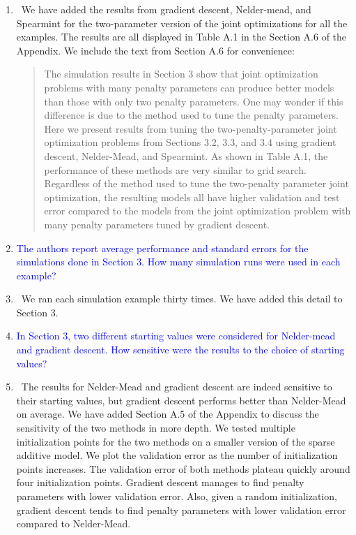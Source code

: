 \documentclass[]{article}
\newcommand{\point}[1]{\item \textcolor{blue}{#1}}
\newcommand{\reply}{\item[]\ }
\begin{document}
\begin{enumerate}
		\reply We have added the results from gradient descent, Nelder-mead, and Spearmint for the two-parameter version of the joint optimizations for all the examples. The results are all displayed in Table A.1 in the Section A.6 of the Appendix. We include the text from Section A.6 for convenience:
		
		\begin{quote}
			The simulation results in Section 3 show that joint optimization problems with many penalty parameters can produce better models than those with only two penalty parameters. One may wonder if this difference is due to the method used to tune the penalty parameters. Here we present results from tuning the two-penalty-parameter joint optimization problems from Sections 3.2, 3.3, and 3.4 using gradient descent, Nelder-Mead, and Spearmint. As shown in Table A.1, the performance of these methods are very similar to grid search. Regardless of the method used to tune the two-penalty parameter joint optimization, the resulting models all have higher validation and test error compared to the models from the joint optimization problem with many penalty parameters tuned by gradient descent.
		\end{quote}
		
		\point{The authors report average performance and standard errors for the simulations done in Section 3. How many simulation runs were used in each example?}
		
		\reply We ran each simulation example thirty times. We have added this detail to Section 3.
				
		\point{In Section 3, two different starting values were considered for Nelder-mead and gradient descent. How sensitive were the results to the choice of starting values?}
		
		\reply The results for Nelder-Mead and gradient descent are indeed sensitive to their starting values, but gradient descent performs better than Nelder-Mead on average. We have added Section A.5 of the Appendix to discuss the sensitivity of the two methods in more depth. We tested multiple initialization points for the two methods on a smaller version of the sparse additive model. We plot the validation error as the number of initialization points increases. The validation error of both methods plateau quickly around four initialization points. Gradient descent manages to find penalty parameters with lower validation error. Also, given a random initialization, gradient descent tends to find penalty parameters with lower validation error compared to Nelder-Mead.
		

\end{enumerate}
\end{document}
